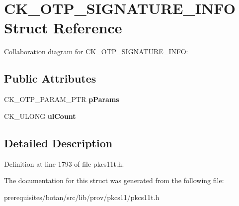 \hypertarget{struct_c_k___o_t_p___s_i_g_n_a_t_u_r_e___i_n_f_o}{}\section{C\+K\+\_\+\+O\+T\+P\+\_\+\+S\+I\+G\+N\+A\+T\+U\+R\+E\+\_\+\+I\+N\+FO Struct Reference}
\label{struct_c_k___o_t_p___s_i_g_n_a_t_u_r_e___i_n_f_o}


Collaboration diagram for C\+K\+\_\+\+O\+T\+P\+\_\+\+S\+I\+G\+N\+A\+T\+U\+R\+E\+\_\+\+I\+N\+FO\+:
\subsection*{Public Attributes}
\begin{DoxyCompactItemize}
\item 
\mbox{\label{struct_c_k___o_t_p___s_i_g_n_a_t_u_r_e___i_n_f_o_af797fa1af98b6da33ddba34f156143be}} 
C\+K\+\_\+\+O\+T\+P\+\_\+\+P\+A\+R\+A\+M\+\_\+\+P\+TR {\bfseries p\+Params}
\item 
\mbox{\label{struct_c_k___o_t_p___s_i_g_n_a_t_u_r_e___i_n_f_o_a5b747d449bdffb39163d0d143d50711b}} 
C\+K\+\_\+\+U\+L\+O\+NG {\bfseries ul\+Count}
\end{DoxyCompactItemize}


\subsection{Detailed Description}


Definition at line 1793 of file pkcs11t.\+h.



The documentation for this struct was generated from the following file\+:\begin{DoxyCompactItemize}
\item 
prerequisites/botan/src/lib/prov/pkcs11/pkcs11t.\+h\end{DoxyCompactItemize}
